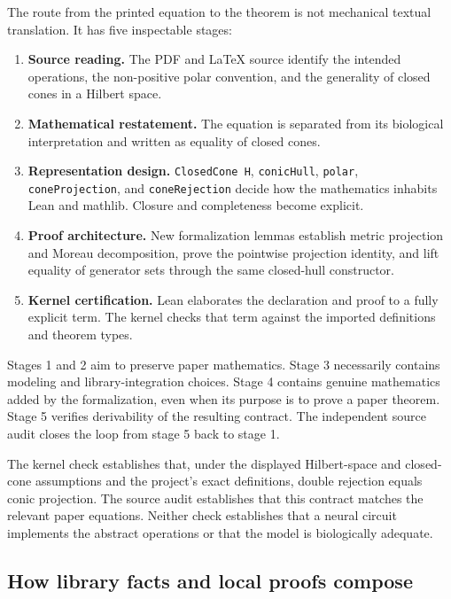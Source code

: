 \documentclass[11pt,a4paper]{article}
\begin{document}
The route from the printed equation to the theorem is not mechanical textual
translation. It has five inspectable stages:

\begin{enumerate}[label=\arabic*.]
  \item \textbf{Source reading.} The PDF and LaTeX source identify the intended
    operations, the non-positive polar convention, and the generality of closed
    cones in a Hilbert space.
  \item \textbf{Mathematical restatement.} The equation is separated from its
    biological interpretation and written as equality of closed cones.
  \item \textbf{Representation design.} \texttt{ClosedCone H},
    \texttt{conicHull}, \texttt{polar}, \texttt{coneProjection}, and
    \texttt{coneRejection} decide how the mathematics inhabits Lean and
    mathlib. Closure and completeness become explicit.
  \item \textbf{Proof architecture.} New formalization lemmas establish metric
    projection and Moreau decomposition, prove the pointwise projection
    identity, and lift equality of generator sets through the same closed-hull
    constructor.
  \item \textbf{Kernel certification.} Lean elaborates the declaration and proof
    to a fully explicit term. The kernel checks that term against the imported
    definitions and theorem types.
\end{enumerate}

Stages 1 and 2 aim to preserve paper mathematics. Stage 3 necessarily contains
modeling and library-integration choices. Stage 4 contains genuine mathematics
added by the formalization, even when its purpose is to prove a paper theorem.
Stage 5 verifies derivability of the resulting contract. The independent source
audit closes the loop from stage 5 back to stage 1.

\begin{keyresult}
The kernel check establishes that, under the displayed Hilbert-space and
closed-cone assumptions and the project's exact definitions, double rejection
equals conic projection. The source audit establishes that this contract matches
the relevant paper equations. Neither check establishes that a neural circuit
implements the abstract operations or that the model is biologically adequate.
\end{keyresult}

\subsection{How library facts and local proofs compose}
\end{document}

